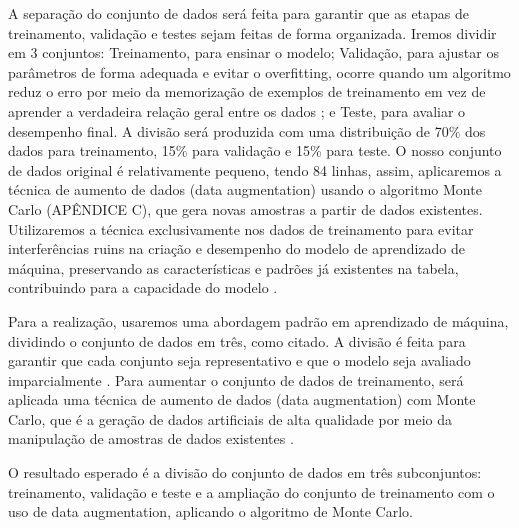 A separação do conjunto de dados será feita para garantir que as etapas de treinamento, validação e testes sejam feitas de forma organizada. Iremos dividir em 3 conjuntos: Treinamento, para ensinar o modelo; Validação, para ajustar os parâmetros de forma adequada e evitar o overfitting, ocorre quando um algoritmo reduz o erro por meio da memorização de exemplos de treinamento em vez de aprender a verdadeira relação geral entre os dados \cite{bashir2020}; e Teste, para avaliar o desempenho final. A divisão será produzida com uma distribuição de 70\% dos dados para treinamento, 15\% para validação e 15\% para teste. O nosso conjunto de dados original é relativamente pequeno, tendo 84 linhas, assim, aplicaremos a técnica de aumento de dados (data augmentation) usando o algoritmo Monte Carlo (APÊNDICE C), que gera novas amostras a partir de dados existentes. Utilizaremos a técnica exclusivamente nos dados de treinamento para evitar interferências ruins na criação e desempenho do modelo de aprendizado de máquina, preservando as características e padrões já existentes na tabela, contribuindo para a capacidade do modelo \cite{kiar2021}. 

Para a realização, usaremos uma abordagem padrão em aprendizado de máquina, dividindo o conjunto de dados em três, como citado. A divisão é feita para garantir que cada conjunto seja representativo e que o modelo seja avaliado imparcialmente \cite{bashir2020}. Para aumentar o conjunto de dados de treinamento, será aplicada uma técnica de aumento de dados (data augmentation) com Monte Carlo, que é a geração de dados artificiais de alta qualidade por meio da manipulação de amostras de dados existentes \cite{wang2019}. 

O resultado esperado é a divisão do conjunto de dados em três subconjuntos: treinamento, validação e teste e a ampliação do conjunto de treinamento com o uso de data augmentation, aplicando o algoritmo de Monte Carlo. 

